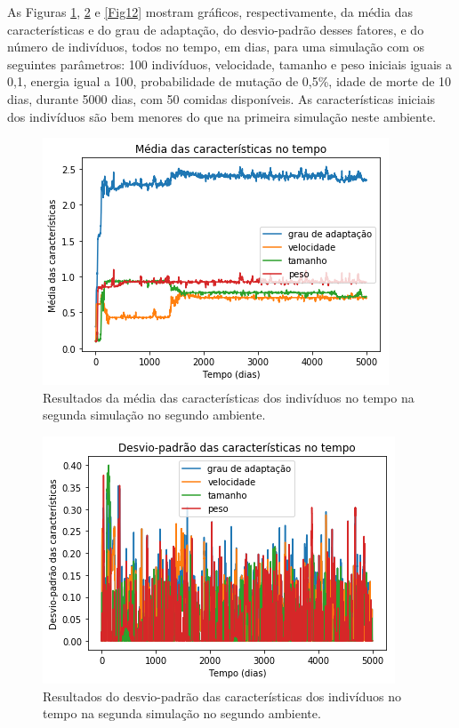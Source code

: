 \documentclass[10pt,brazil,english]{article}
\begin{document}
        As Figuras \ref{Fig10}, \ref{Fig11} e \ref{Fig12} mostram gráficos, respectivamente, da média das características e do grau de adaptação, do desvio-padrão desses fatores, e do número de indivíduos, todos no tempo, em dias, para uma simulação com os seguintes parâmetros: 100 indivíduos, velocidade, tamanho e peso iniciais iguais a 0,1, energia igual a 100, probabilidade de mutação de 0,5\%, idade de morte de 10 dias, durante  5000 dias, com 50 comidas disponíveis. As características iniciais dos indivíduos são bem menores do que na primeira simulação neste ambiente.
        
        \begin{figure}[!hbtp]
            \begin{center}
                \includegraphics[scale=0.5]{Images/2-4.png}
            \end{center}
            \caption{Resultados da média das características dos indivíduos no tempo na segunda simulação no segundo ambiente.}
            \label{Fig10}
        \end{figure} 
        
        \begin{figure}[!hbtp]
            \begin{center}
                \includegraphics[scale=0.5]{Images/2-5.png}
            \end{center}
            \caption{Resultados do desvio-padrão das características dos indivíduos no tempo na segunda simulação no segundo ambiente.}
            \label{Fig11}
        \end{figure} 
        
\end{document}
